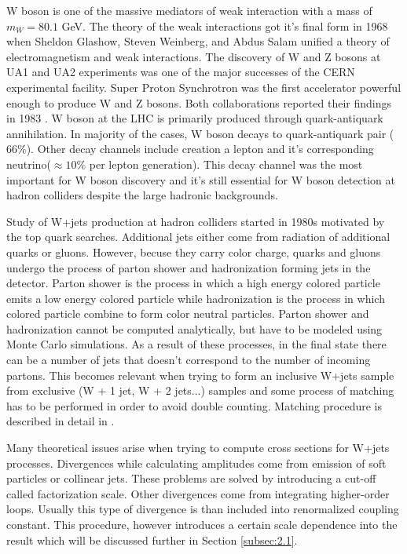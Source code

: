 W boson is one of the massive mediators of weak interaction with a mass of $m_W=80.1$ GeV.
The theory of the weak interactions got it's final form in 1968 when Sheldon Glashow, Steven Weinberg, and Abdus Salam unified a theory of electromagnetism and weak interactions. The discovery of W and Z bosons at UA1 and UA2 experiments was one of the major successes of the CERN experimental facility. Super Proton Synchrotron was the first accelerator powerful enough to produce W and Z bosons. Both collaborations reported their findings in 1983 \cite{Arnison:1983rp,Banner:1983jy}.
W boson at the LHC is primarily produced through quark-antiquark annihilation. In majority of the cases, W boson decays to quark-antiquark pair ($66\%$). Other decay channels include creation a lepton and it's corresponding neutrino($\approx 10\%$ per lepton generation). This decay channel was the most important for W boson discovery and it's still essential for W boson detection at hadron colliders despite the large hadronic backgrounds. 
\par Study of W+jets production at hadron colliders started in 1980s motivated by the top quark searches. Additional jets either come from radiation of additional quarks or gluons. However, becuse they carry color charge, quarks and gluons undergo the process of parton shower and hadronization forming jets in the detector. Parton shower is the process in which a high energy colored particle emits a low energy colored particle while hadronization is the process in which colored particle combine to form color neutral particles. Parton shower and hadronization cannot be computed analytically, but have to be modeled using Monte Carlo simulations. As a result of these processes, in the final state there can be a number of jets that doesn't  correspond to the number of incoming partons. This becomes relevant when trying to form an inclusive W+jets sample from exclusive (W + 1 jet, W + 2 jets...) samples and some process of matching has to be performed in order to avoid double counting. Matching procedure is described in detail in \cite{Campbell:2008cr}.  
\par Many theoretical issues arise when trying to compute cross sections for W+jets processes. Divergences while calculating amplitudes come from emission of soft particles or collinear jets. These problems are solved by introducing a cut-off called factorization scale. Other divergences come from integrating higher-order loops. Usually this type of divergence is than included into renormalized coupling constant. This procedure, however introduces a certain scale dependence into the result which will be discussed further in Section \ref{subsec:2.1}. 



